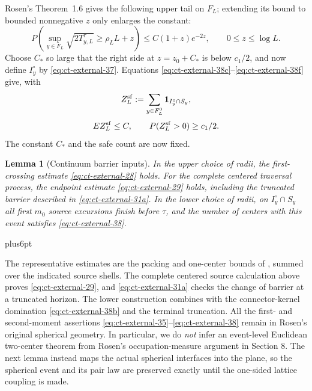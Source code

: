 \documentclass[12pt,reqno]{amsart}
\makeatletter
\theoremstyle{plain}
\newtheorem{lemma}[theorem]{Lemma}
\theoremstyle{definition}
\theoremstyle{remark}
\renewenvironment{proof}[1][\proofname]{%
  \par
  \pushQED{\qed}%
  \normalfont
  \topsep6pt plus6pt\relax
  \trivlist
  \item[\hskip\labelsep\slshape #1\@addpunct{.}]%
  \ignorespaces
}{%
  \popQED
  \endtrivlist
  \@endpefalse
}
\DeclareRobustCommand{\qed}{%
  \leavevmode\unskip\penalty9999\hbox{}\nobreak
  \ifmmode
    \makebox[0pt][l]{\qquad\hbox{\qedsymbol}}%
  \else
    \qquad\hbox{\qedsymbol}%
  \fi
}
\renewcommand{\qedsymbol}{\rule[.47pt]{4pt}{6pt}}
\numberwithin{equation}{section}
\makeatother
\begin{document}
Rosen's Theorem~1.6 gives the following upper tail on $F_L$; extending
its bound to bounded nonnegative $z$ only enlarges the constant:
\begin{equation}
P\left(\sup_{y\in F_L}\sqrt{2T_{y,L}^{\tau}}\ge\rho_LL+z\right)
       \le C(1+z)e^{-2z},\qquad0\le z\le\log L.\label{eq:ct-external-38f}
\end{equation}
Choose $C_*$ so large that the right side at $z=z_0+C_*$
is below $c_1/2$, and now define $I_y^\circ$ by \eqref{eq:ct-external-37}.  Equations
\eqref{eq:ct-external-38c}--\eqref{eq:ct-external-38f} give, with
\[
Z_L^{\rm sf}:=\sum_{y\in F_L^0}{\bf1}_{I_y^\circ\cap S_y},
\]
\begin{equation}
EZ_L^{\rm sf}\le C,\qquad P(Z_L^{\rm sf}>0)\ge c_1/2.\label{eq:ct-external-38}
\end{equation}
The constant $C_*$ and the safe count are now fixed.

\begin{lemma}[Continuum barrier inputs]\label{lem:external-barrier-input}
In the upper choice of radii, the first-crossing estimate
\eqref{eq:ct-external-28} holds.  For the complete centered traversal process,
the endpoint estimate \eqref{eq:ct-external-29} holds, including the truncated
barrier described in \eqref{eq:ct-external-31a}.  In the lower choice of radii,
on $I_y^\circ\cap S_y$ all first $m_0$ source excursions finish before
$\tau$, and the number of centers with this event satisfies
\eqref{eq:ct-external-38}.
\end{lemma}

\begin{proof}[Proof of Lemma~\ref{lem:external-barrier-input}]
The representative estimates are the packing and one-center bounds of
\cite[Proposition~2.5, (2.34)--(2.35)]{Rosen2022}, summed over the indicated
source shells.  The complete centered source calculation above proves
\eqref{eq:ct-external-29}, and \eqref{eq:ct-external-31a} checks the change of
barrier at a truncated horizon.  The lower construction combines
\cite[Lemmas~3.3--3.4]{Rosen2022} with the connector-kernel domination
\eqref{eq:ct-external-38b} and the terminal truncation.
All the first- and second-moment assertions \eqref{eq:ct-external-35}--\eqref{eq:ct-external-38} remain in Rosen's
original spherical geometry.  In particular, we do \emph{not} infer an
event-level Euclidean two-center theorem from Rosen's occupation-measure
argument in Section 8.  The next lemma instead maps the actual spherical
interfaces into the plane, so the spherical event and its pair law are
preserved exactly until the one-sided lattice coupling is made.
\end{proof}
\end{document}
